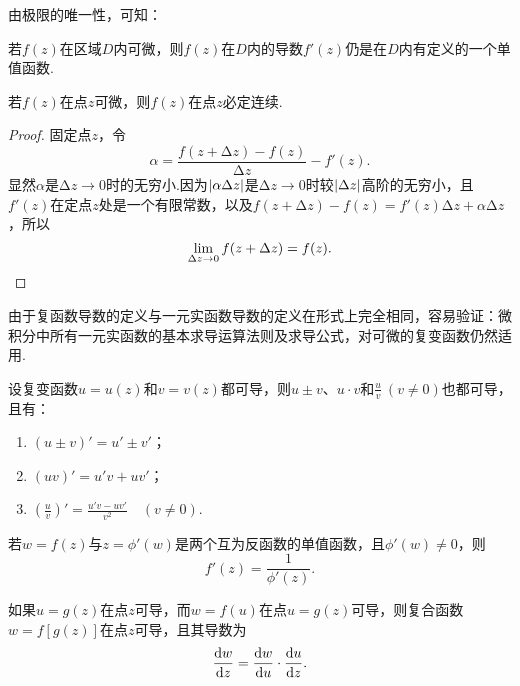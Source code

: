 由极限的唯一性，可知：
\begin{theorem}
若\(f(z)\)在区域\(D\)内可微，则\(f(z)\)在\(D\)内的导数\(f'(z)\)仍是在\(D\)内有定义的一个单值函数.
\end{theorem}

\begin{theorem}[可微的必要条件]
若\(f(z)\)在点\(z\)可微，则\(f(z)\)在点\(z\)必定连续.
\begin{proof}
固定点\(z\)，令\[
\alpha = \frac{f(z+\increment z)-f(z)}{\increment z} - f'(z).
\]显然\(\alpha\)是\(\increment z \to 0\)时的无穷小.因为\(\abs{\alpha \Delta z}\)是\(\increment z \to 0\)时较\(\abs{\Delta z}\)高阶的无穷小，且\(f'(z)\)在定点\(z\)处是一个有限常数，以及\(f(z+\increment z) - f(z) = f'(z) \increment z + \alpha \increment z\)，所以\[
\lim\limits_{\Delta z \to 0} f(z + \Delta z) = f(z).
\qedhere
\]
\end{proof}
\end{theorem}

由于复函数导数的定义与一元实函数导数的定义在形式上完全相同，容易验证：微积分中所有一元实函数的基本求导运算法则及求导公式，对可微的复变函数仍然适用.
\begin{theorem}\label{theorem:解析函数.函数的和差积商的导数}
设复变函数\(u=u(z)\)和\(v=v(z)\)都可导，则\(u \pm v\)、\(u \cdot v\)和\(\frac{u}{v}\ (v\neq0)\)也都可导，且有：
\begin{enumerate}
\item \((u \pm v)' = u' \pm v'\)；
\item \((u v)' = u' v + u v'\)；
\item \(\left(\frac{u}{v}\right)' = \frac{u' v - u v'}{v^2} \quad (v \neq 0)\).
\end{enumerate}
\end{theorem}

\begin{theorem}\label{theorem:解析函数.反函数的导数}
若\(w=f(z)\)与\(z=\phi'(w)\)是两个互为反函数的单值函数，且\(\phi'(w) \neq 0\)，则\[
f'(z) = \frac{1}{\phi'(z)}.
\]
\end{theorem}

\begin{theorem}\label{theorem:解析函数.复合函数的导数}
如果\(u=g(z)\)在点\(z\)可导，而\(w=f(u)\)在点\(u=g(z)\)可导，则复合函数\(w=f[g(z)]\)在点\(z\)可导，且其导数为\[
\dv{w}{z} = \dv{w}{u} \cdot \dv{u}{z}.
\]
\end{theorem}


